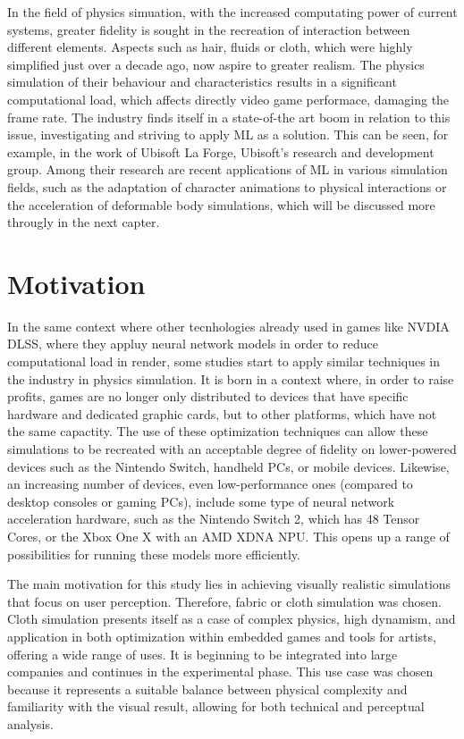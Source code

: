 In the field of physics simuation, with the increased computating power of current systems, greater fidelity is sought in the recreation of interaction between different elements. Aspects such as hair, fluids or cloth, which were highly simplified just over a decade ago, now aspire to greater realism. The physics simulation of their behaviour and characteristics results in a significant computational load, which affects directly video game performace, damaging the frame rate. The industry finds itself in a state-of-the art boom in relation to this issue, investigating and striving to apply ML as a solution. This can be seen, for example, in the work of Ubisoft La Forge, Ubisoft's research and development group. Among their research are recent applications of ML in various simulation fields, such as the adaptation of character animations to physical interactions or the acceleration of deformable body simulations, which will be discussed more througly in the next capter.
\section*{Motivation}
In the same context where other tecnhologies already used in games like NVDIA DLSS, where they appluy neural network models  in order to reduce computational load in render, some studies start to apply similar techniques in the industry in physics simulation. It is born in a context where, in order to raise profits, games are no longer only distributed to devices that have specific hardware and dedicated graphic cards, but to other platforms, which have not the same capactity. The use of these optimization techniques can allow these simulations to be recreated with an acceptable degree of fidelity on lower-powered devices such as the Nintendo Switch, handheld PCs, or mobile devices. Likewise, an increasing number of devices, even low-performance ones (compared to desktop consoles or gaming PCs), include some type of neural network acceleration hardware, such as the Nintendo Switch 2, which has 48 Tensor Cores, or the Xbox One X with an AMD XDNA NPU. This opens up a range of possibilities for running these models more efficiently.

The main motivation for this study lies in achieving visually realistic simulations that focus on user perception. Therefore, fabric or cloth simulation was chosen. Cloth simulation presents itself as a case of complex physics, high dynamism, and application in both optimization within embedded games and tools for artists, offering a wide range of uses. It is beginning to be integrated into large companies and continues in the experimental phase. This use case was chosen because it represents a suitable balance between physical complexity and familiarity with the visual result, allowing for both technical and perceptual analysis.

